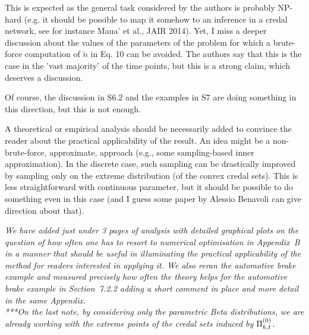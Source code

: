 \documentclass[12pt, a4paper]{elsarticle}
\begin{document}
This is expected as the general task considered by the authors is probably NP-hard (e.g. it should be possible to map it somehow to an inference in a credal network, see for instance Maua' et al., JAIR 2014). Yet, I miss a deeper discussion about the values of the parameters of the problem for which a brute-force computation of $\tilde{n}$ in Eq. 10 can be avoided. The authors say that this is the case in the 'vast majority' of the time points, but this is a strong claim, which deserves a discussion.

Of course, the discussion in S6.2 and the examples in S7 are doing something in this direction, but this is not enough.

A theoretical or empirical analysis should be necessarily added to convince the reader about the practical applicability of the result.
An idea might be a non-brute-force, approximate, approach (e.g., some sampling-based inner approximation). In the discrete case, such sampling can be drastically improved by sampling only on the extreme distribution (of the convex credal sets). This is less straightforward with continuous parameter, but it should be possible to do something even in this case (and I guess some paper by Alessio Benavoli can give direction about that).

\medskip
\emph{We have added just under 3 pages of analysis with detailed graphical plots on the question of how often one has to resort to numerical optimisation in Appendix~B in a manner that should be useful in illuminating the practical applicability of the method for readers interested in applying it.
We also reran the automotive brake example and measured precisely how often the theory helps for the automotive brake example in Section~7.2.2 adding a short comment in place and more detail in the same Appendix.}\\

\emph{***On the last note, by considering only the parametric Beta distributions,
we are already working with the extreme points of the credal sets induced by $\Pi^{(0)}_{k,t}$.}
%
\medskip
\end{document}
